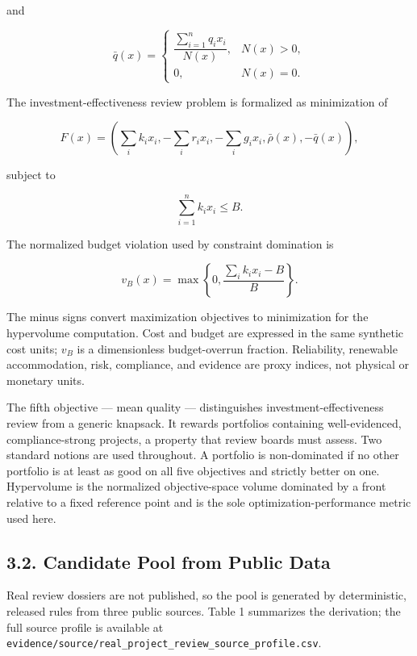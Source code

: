 \documentclass[
  10pt,
  a4paper,
]{article}
\begin{document}
and

\[
\bar q(x)=
\begin{cases}
\dfrac{\sum_{i=1}^{n}q_i x_i}{N(x)},&N(x)>0,\\
0,&N(x)=0.
\end{cases}
\]

The investment-effectiveness review problem is formalized as
minimization of

\[
F(x)=\left(\sum_i k_i x_i,-\sum_i r_i x_i,-\sum_i g_i x_i,\bar\rho(x),-\bar q(x)\right),
\]

subject to

\[
\sum_{i=1}^{n}k_i x_i\leq B.
\]

The normalized budget violation used by constraint domination is

\[
v_B(x)=\max\!\left\{0,\frac{\sum_i k_i x_i-B}{B}\right\}.
\]

The minus signs convert maximization objectives to minimization for the
hypervolume computation. Cost and budget are expressed in the same
synthetic cost units; \(v_B\) is a dimensionless budget-overrun
fraction. Reliability, renewable accommodation, risk, compliance, and
evidence are proxy indices, not physical or monetary units.

The fifth objective --- mean quality --- distinguishes
investment-effectiveness review from a generic knapsack. It rewards
portfolios containing well-evidenced, compliance-strong projects, a
property that review boards must assess. Two standard notions are used
throughout. A portfolio is non-dominated if no other portfolio is at
least as good on all five objectives and strictly better on one.
Hypervolume is the normalized objective-space volume dominated by a
front relative to a fixed reference point and is the sole
optimization-performance metric used here.

\subsection{3.2. Candidate Pool from Public
Data}\label{candidate-pool-from-public-data}

Real review dossiers are not published, so the pool is generated by
deterministic, released rules from three public sources. Table 1
summarizes the derivation; the full source profile is available at
\texttt{evidence/source/real\_project\_review\_source\_profile.csv}.
\end{document}
